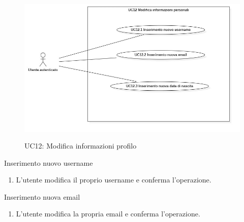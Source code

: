 \begin{figure}[!ht] 
  \centering 
  \includegraphics[width=0.9\columnwidth, alt={Caso d'uso relativo alla modifica delle informazioni del profilo}]{immagini/usecase/UC12.jpg}
  \caption{UC12: Modifica informazioni profilo}\label{fig:uc:modifica-informazioni-profilo}
\end{figure}

\newpage

\begin{usecase}{12.1}{Inserimento nuovo username}\label{uc:modifica-username}
  \usecasemain{}
  
  \begin{enumerate}
    \item L'utente modifica il proprio username e conferma l'operazione.
  \end{enumerate}
  
\end{usecase}

\begin{usecase}{12.2}{Inserimento nuova email}\label{uc:modifica-email}
  \usecasemain{}
  
  \begin{enumerate}
    \item L'utente modifica la propria email e conferma l'operazione.
  \end{enumerate}
  
\end{usecase}

